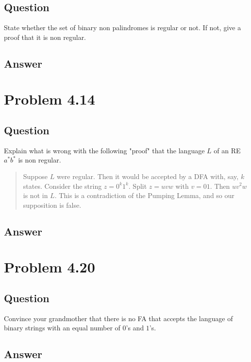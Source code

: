 \documentclass[12pt, a4paper]{article}
\begin{document}
\subsection{Question}
State whether the set of binary non palindromes is regular or not. If not, give a proof that it is non regular.
\subsection{Answer}

\section{Problem 4.14}
\subsection{Question}
Explain what is wrong with the following "proof" that the language $L$ of an RE $a^{*}b^{*}$ is non regular.

\begin{quotation}
Suppose $L$ were regular. Then it would be accepted by a DFA with, say, $k$ states. Consider the string $z=0^{k}1^{k}$. Split $z=uvw$ with $v=01$. Then $uv^{2}w$ is not in $L$. This is a contradiction of the Pumping Lemma, and so our supposition is false.
\end{quotation}
\subsection{Answer}

\section{Problem 4.20}
\subsection{Question}
Convince your grandmother that there is no FA that accepts the language of binary strings with an equal number of $0$'s and $1$'s.
\subsection{Answer}
\end{document}
